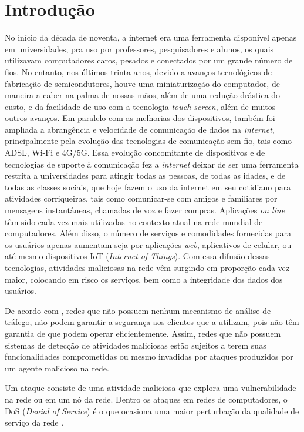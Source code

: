 \chapter[Introdução]{Introdução}
\label{introducao}

No início da década de noventa, a internet era uma ferramenta disponível apenas em universidades, pra uso por professores, pesquisadores e alunos, os quais utilizavam computadores caros, pesados e conectados por um grande número de fios. No entanto, nos últimos trinta anos, devido a avanços tecnológicos de fabricação de semicondutores, houve uma miniaturização do computador, de maneira a caber na palma de nossas mãos, além de uma redução drástica do custo, e da facilidade de uso com a tecnologia \textit{touch screen}, além de muitos outros avanços. Em paralelo com as melhorias dos dispositivos, também foi ampliada a abrangência e velocidade de comunicação de dados na \textit{internet}, principalmente pela evolução das tecnologias de comunicação sem fio, tais como ADSL, Wi-Fi e 4G/5G. Essa evolução concomitante de dispositivos e de tecnologias de suporte à comunicação fez a \textit{internet} deixar de ser uma ferramenta restrita a universidades para atingir todas as pessoas, de todas as idades, e de todas as classes sociais, que hoje fazem o uso da internet em seu cotidiano para atividades corriqueiras, tais como comunicar-se com amigos e familiares por mensagens instantâneas, chamadas de voz e fazer compras. Aplicações \textit{on line} têm sido cada vez mais utilizadas no contexto atual na rede mundial de computadores. Além disso, o número de serviços e comodidades fornecidas para os usuários apenas aumentam seja por aplicações \textit{web}, aplicativos de celular, ou até mesmo dispositivos IoT (\textit{Internet of Things}). Com essa difusão dessas tecnologias, atividades maliciosas na rede vêm surgindo em proporção cada vez maior, colocando em risco os serviços, bem como a integridade dos dados dos usuários. 

De acordo com , redes que não possuem nenhum mecanismo de análise de tráfego, não podem garantir a segurança aos clientes que a utilizam, pois não têm garantia de que podem operar eficientemente. Assim, redes que não possuem sistemas de detecção de atividades maliciosas estão sujeitos a terem suas funcionalidades comprometidas ou mesmo invadidas por ataques produzidos por um agente malicioso na rede.

Um ataque consiste de uma atividade maliciosa que explora uma vulnerabilidade na rede ou em um nó da rede. Dentro os ataques em redes de computadores, o DoS (\textit{Denial of Service}) é o que ocasiona uma maior perturbação da qualidade de serviço da rede \cite{badishi2006exposing}.

